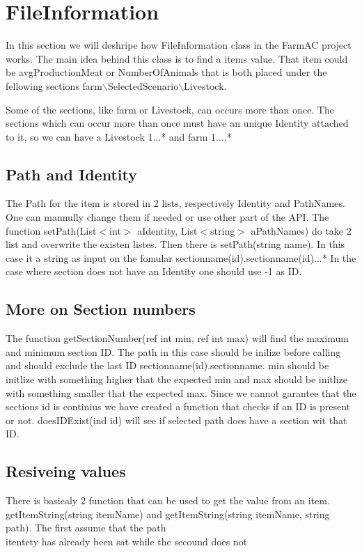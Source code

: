 \chapter{FileInformation}

In this section we will deshripe how FileInformation class in the FarmAC project works. The main idea behind this class is to find a items value. That item could be avgProductionMeat or NumberOfAnimals that is both placed under the fellowing sections farm$\backslash$SelectedScenario$\backslash$Livestock.

Some of the sections, like farm or Livestock, can occurs more than once. The sections which can occur more than once must have an unique Identity attached to it, so we can have a Livestock 1...* and farm 1....*

\section{Path and Identity}
The Path for the item is stored in 2 lists, respectively Identity and PathNames. One can mannully change them if needed or use other part of the API. The function setPath(List$<$int$>$ aIdentity, List$<$string$>$ aPathNames) do take 2 list and overwrite the existen listes. Then there is setPath(string name). In this case it a string as input on the fomular sectionname(id).sectionname(id)...*
In the case where section does not have an Identity one should use -1 as ID.
\section{More on Section numbers}
The function getSectionNumber(ref int min, ref int max) will find the maximum and minimum section ID. The path in this case should be inilize before calling and should exclude the last ID sectionname(id).sectionname.  min should be initlize with something higher that the expected min and max should be initlize with something smaller that the expected max.
Since we cannot garantee that the sections id is continius we have created a function that checks if an ID is present or not. doesIDExist(ind id) will see if selected path does have a section wit that ID.
\section{Resiveing values}
There is basicaly 2 function that can be used to get the value from an item. getItemString(string itemName) and getItemString(string itemName, string path). The first assume that the path\\itentety has already been sat while the secound does not 

